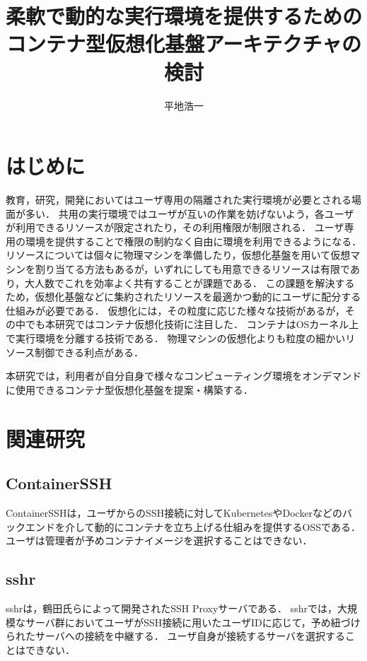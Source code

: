 \documentclass[dvipdfmx]{cs-handout}
\title{柔軟で動的な実行環境を提供するための\\コンテナ型仮想化基盤アーキテクチャの検討}
\author{平地浩一}
\newcommand{\Note}[1]{\noindent \textbf{\textcolor{blue}{#1}}}
\begin{document}
\maketitle

\section{はじめに}

教育，研究，開発においてはユーザ専用の隔離された実行環境が必要とされる場面が多い．
共用の実行環境ではユーザが互いの作業を妨げないよう，各ユーザが利用できるリソースが限定されたり，その利用権限が制限される．
ユーザ専用の環境を提供することで権限の制約なく自由に環境を利用できるようになる．
リソースについては個々に物理マシンを準備したり，仮想化基盤を用いて仮想マシンを割り当てる方法もあるが，いずれにしても用意できるリソースは有限であり，大人数でこれを効率よく共有することが課題である．
この課題を解決するため，仮想化基盤などに集約されたリソースを最適かつ動的にユーザに配分する仕組みが必要である．
仮想化には，その粒度に応じた様々な技術があるが，その中でも本研究ではコンテナ仮想化技術に注目した．
コンテナはOSカーネル上で実行環境を分離する技術である．
物理マシンの仮想化よりも粒度の細かいリソース制御できる利点がある．

本研究では，利用者が自分自身で様々なコンピューティング環境をオンデマンドに使用できるコンテナ型仮想化基盤を提案・構築する．

\section{関連研究}

\subsection{ContainerSSH}

ContainerSSHは，ユーザからのSSH接続に対してKubernetesやDockerなどのバックエンドを介して動的にコンテナを立ち上げる仕組みを提供するOSSである\cite{ContainerSSH}．
ユーザは管理者が予めコンテナイメージを選択することはできない．

\subsection{sshr}

sshrは，鶴田氏らによって開発されたSSH Proxyサーバである\cite{Tsuruta2020}．
sshrでは，大規模なサーバ群においてユーザがSSH接続に用いたユーザIDに応じて，予め紐づけられたサーバへの接続を中継する．
ユーザ自身が接続するサーバを選択することはできない．
\end{document}
